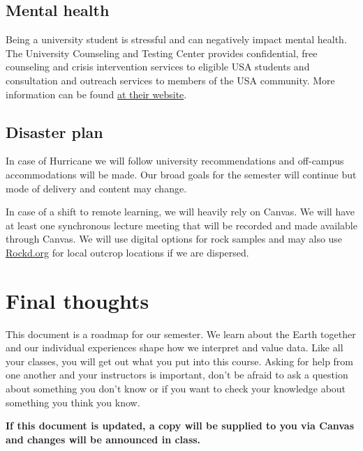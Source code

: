 \documentclass[11pt,]{article}
\begin{document}
\subsection{Mental health}\label{mental-health}

Being a university student is stressful and can negatively impact mental
health. The University Counseling and Testing Center provides
confidential, free counseling and crisis intervention services to
eligible USA students and consultation and outreach services to members
of the USA community. More information can be found
\href{https://www.southalabama.edu/departments/counseling/}{at their
website}.

\subsection{Disaster plan}\label{disaster-plan}

In case of Hurricane we will follow university recommendations and
off-campus accommodations will be made. Our broad goals for the semester
will continue but mode of delivery and content may change.

In case of a shift to remote learning, we will heavily rely on Canvas.
We will have at least one synchronous lecture meeting that will be
recorded and made available through Canvas. We will use digital options
for rock samples and may also use \href{https://rockd.org/}{Rockd.org}
for local outcrop locations if we are dispersed.

\section{Final thoughts}\label{final-thoughts}

This document is a roadmap for our semester. We learn about the Earth
together and our individual experiences shape how we interpret and value
data. Like all your classes, you will get out what you put into this
course. Asking for help from one another and your instructors is
important, don't be afraid to ask a question about something you don't
know or if you want to check your knowledge about something you think
you know.

\textbf{If this document is updated, a copy will be supplied to you via
Canvas and changes will be announced in class.}
\end{document}

